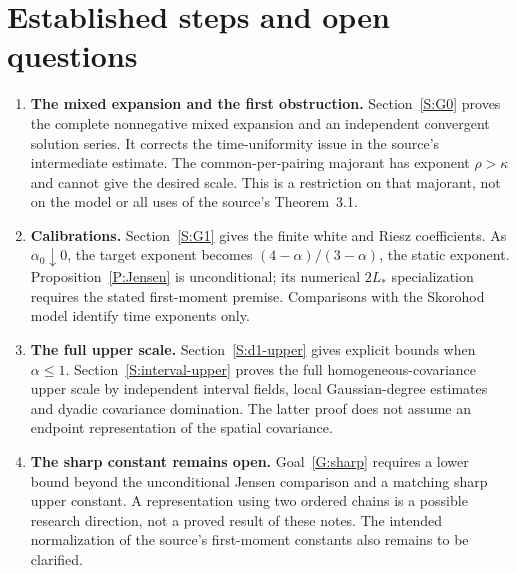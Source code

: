 \documentclass[12pt]{article}
\numberwithin{equation}{section}
\theoremstyle{definition}
\begin{document}
\section{Established steps and open questions}\label{S:route}

\begin{enumerate}[1.]
  \item \textbf{The mixed expansion and the first obstruction.}
    Section~\ref{S:G0} proves the complete nonnegative mixed expansion
    and an independent convergent solution series. It corrects the
    time-uniformity issue in the source's intermediate estimate.
    The common-per-pairing majorant has exponent $\rho>\kappa$ and cannot
    give the desired scale. This is a restriction on that majorant,
    not on the model or all uses of the source's Theorem~3.1.
  \item \textbf{Calibrations.}
    Section~\ref{S:G1} gives the finite white and Riesz coefficients.
    As $\alpha_0\downarrow0$, the target exponent becomes
    $(4-\alpha)/(3-\alpha)$, the static exponent.
    Proposition~\ref{P:Jensen} is unconditional; its numerical
    $2L_*$ specialization requires the stated first-moment premise.
    Comparisons with the Skorohod model identify time exponents only.
  \item \textbf{The full upper scale.}
    Section~\ref{S:d1-upper} gives explicit bounds when $\alpha\le1$.
    Section~\ref{S:interval-upper} proves the full homogeneous-covariance
    upper scale by independent interval fields, local Gaussian-degree
    estimates and dyadic covariance domination. The latter proof does
    not assume an endpoint representation of the spatial covariance.
  \item \textbf{The sharp constant remains open.}
    Goal~\ref{G:sharp} requires a lower bound beyond the unconditional
    Jensen comparison and a matching sharp upper constant. A representation
    using two ordered chains is a possible research direction, not a
    proved result of these notes. The intended normalization of the
    source's first-moment constants also remains to be clarified.
\end{enumerate}


\end{document}
